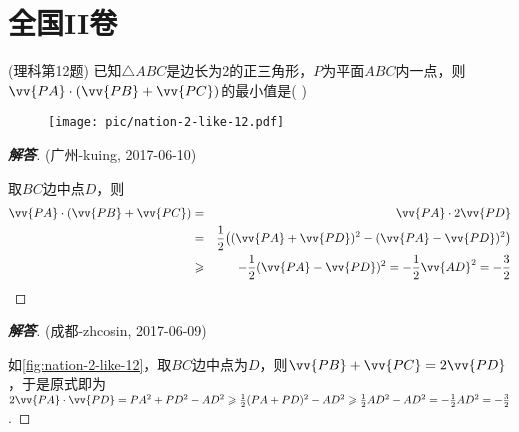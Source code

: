 \documentclass{ctexart}
\begin{document}
\section{全国II卷}
\label{sec:nation-2}

\begin{exercise}(理科第12题)
  已知$\triangle ABC$是边长为2的正三角形，$P$为平面$ABC$内一点，则$\vv{PA} \cdot (\vv{PB}+\vv{PC})$的最小值是(    )

\end{exercise}

\begin{figure}[htbp]
  \centering
\texttt{[image: pic/nation-2-like-12.pdf]}
\caption{}
\label{fig:nation-2-like-12}
\end{figure}

\begin{proof}[\textbf{解答}](广州-kuing, 2017-06-10)

  取$BC$边中点$D$，则
  \begin{eqnarray*}
    \vv{PA} \cdot (\vv{PB}+\vv{PC}) & = &  \vv{PA} \cdot 2 \vv{PD} \\
                                    & = & \frac{1}{2} \big( (\vv{PA}+\vv{PD})^2 - (\vv{PA}-\vv{PD})^2 \big) \\
    & \geqslant & -\frac{1}{2}(\vv{PA}-\vv{PD})^2 = -\frac{1}{2}\vv{AD}^2 = - \frac{3}{2}
  \end{eqnarray*}
\end{proof}

\begin{proof}[\textbf{解答}](成都-zhcosin, 2017-06-09)

  如\autoref{fig:nation-2-like-12}，取$BC$边中点为$D$，则$\vv{PB}+\vv{PC}=2\vv{PD}$，于是原式即为$2\vv{PA}\cdot \vv{PD}=PA^2+PD^2-AD^2 \geqslant \frac{1}{2}(PA+PD)^2 - AD^2 \geqslant \frac{1}{2}AD^2 -  AD^2 = - \frac{1}{2} AD^2 = -\frac{3}{2}$.
\end{proof}
\end{document}
